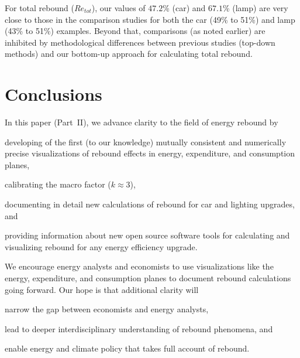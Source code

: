 \documentclass[12pt]{article}\usepackage[]{graphicx}\usepackage[]{xcolor}
\begin{document}
For total rebound ($Re_{tot}$),
our values of
$47.2$\% (car) and
$67.1$\% (lamp)
are very close to those in the comparison studies for both the car (49\% to 51\%) and
lamp (43\% to 51\%) examples.
Beyond that, comparisons (as noted earlier) are inhibited
by methodological differences between previous studies (top-down methods)
and our bottom-up approach for calculating total rebound.


\section{Conclusions}
\label{sec:conclusion}

In this paper (Part~II), we advance clarity to the field of energy rebound
by 
%
\begin{enumerate*}[label={(\roman*)}]
	
  \item developing of the first (to our knowledge) 
        mutually consistent and numerically precise
        visualizations of rebound effects
        in energy, expenditure, and consumption planes, 
        
  \item calibrating the macro factor ($k \approx 3$),

  \item documenting in detail new calculations of rebound for car and lighting  
        upgrades, and 
        
  \item providing information about new open source software tools
        for calculating and visualizing rebound 
        for any energy efficiency upgrade.
  
\end{enumerate*}
%
We encourage energy analysts and economists to use visualizations
like the energy, expenditure, and consumption planes
to document rebound calculations going forward.
Our hope is that additional clarity will 
%
\begin{enumerate*}[label={(\roman*)}]
	
  \item narrow the gap between economists and energy analysts,
  
  \item lead to deeper interdisciplinary understanding of rebound phenomena, and
  
  \item enable energy and climate policy
        that takes full account of rebound.

\end{enumerate*}
\end{document}
